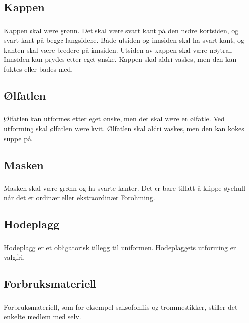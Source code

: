 \documentclass{article}
\newenvironment{statute}[1][]
    {
        \titleformat{\subsubsection}[runin]{\normalfont}{\hspace{1pt}\textit{\S\hspace{5pt}\thesubsubsection}}{0pt}{\rule{4pt}{0pt}}{}
        \subsubsection{}#1
        \begin{minipage}[t]{0.9\linewidth}
    }
    {
        \end{minipage}
        
        \ignorespacesafterend
    }
\begin{document}
            
        \subsection{Kappen}
                \begin{statute}
                    Kappen skal være grønn. Det skal være svart kant på den nedre kortsiden, og svart kant på begge langsidene. Både utsiden og innsiden skal ha svart kant, og kanten skal være bredere på innsiden. Utsiden av kappen skal være nøytral. Innsiden kan prydes etter eget ønske. Kappen skal aldri vaskes, men den kan fuktes eller bades med.
                \end{statute}

        \subsection{Ølfatlen}
            \begin{statute}
                Ølfatlen kan utformes etter eget ønske, men det skal være en ølfatle. Ved utforming skal ølfatlen være hvit. Ølfatlen skal aldri vaskes, men den kan kokes suppe på.
            \end{statute}
            
        \subsection{Masken}
            \begin{statute}
                Masken skal være grønn og ha svarte kanter. Det er bare tillatt å klippe øyehull når det er ordinær eller ekstraordinær Forohming.
            \end{statute}
           
        \subsection{Hodeplagg}
            \begin{statute}
                Hodeplagg er et obligatorisk tillegg til uniformen. Hodeplaggets utforming er valgfri.
            \end{statute}
            
        \subsection{Forbruksmateriell}
            \begin{statute}
                Forbruksmateriell, som for eksempel saksofonflis og trommestikker, stiller det enkelte medlem med selv.
            \end{statute}
            
\end{document}

